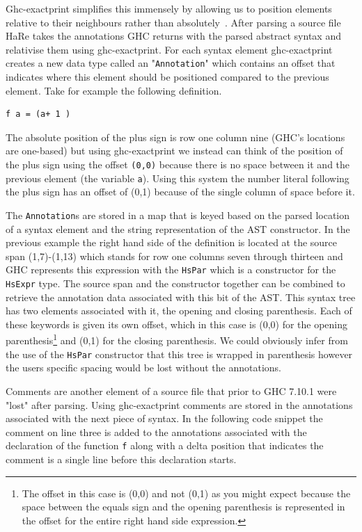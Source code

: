 Ghc-exactprint simplifies this immensely by allowing us to position elements relative to their neighbours rather than absolutely~\citep{exactprint}. After parsing a source file HaRe takes the annotations GHC returns with the parsed abstract syntax and relativise them using ghc-exactprint. For each syntax element ghc-exactprint creates a new data type called an "\texttt{Annotation}" which contains an offset that indicates where this element should be positioned compared to the previous element. Take for example the following definition.

\begin{lstlisting} 
f a = (a+ 1 )
\end{lstlisting}

The absolute position of the plus sign is row one column nine (GHC's locations are one-based) but using ghc-exactprint we instead can think of the position of the plus sign using the offset \texttt{(0,0)} because there is no space between it and the previous element (the variable \texttt{a}). Using this system the number literal following the plus sign has an offset of (0,1) because of the single column of space before it. 

The \texttt{Annotation}s are stored in a map that is keyed based on the parsed location of a syntax element and the string representation of the AST constructor. In the previous example the right hand side of the definition is located at the source span (1,7)-(1,13) which stands for row one columns seven through thirteen and GHC represents this expression with the \texttt{HsPar} which is a constructor for the \texttt{HsExpr} type. The source span and the constructor together can be combined to retrieve the annotation data associated with this bit of the AST. This syntax tree has two elements associated with it, the opening and closing parenthesis. Each of these keywords is given its own offset, which in this case is (0,0) for the opening parenthesis\footnote{The offset in this case is (0,0) and not (0,1) as you might expect because the space between the equals sign and the opening parenthesis is represented in the offset for the entire right hand side expression.} and (0,1) for the closing parenthesis. We could obviously infer from the use of the \texttt{HsPar} constructor that this tree is wrapped in parenthesis however the users specific spacing would be lost without the annotations.

Comments are another element of a source file that prior to GHC 7.10.1 were "lost" after parsing. Using ghc-exactprint comments are stored in the annotations associated with the next piece of syntax. In the following code snippet the comment on line three is added to the annotations associated with the declaration of the function \texttt{f} along with a delta position that indicates the comment is a single line before this declaration starts.

